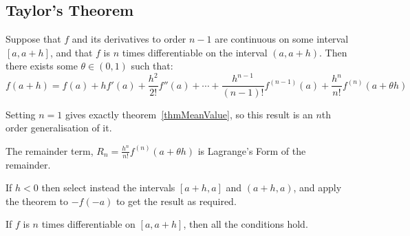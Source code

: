 \documentclass[../Main.tex]{subfiles}
\begin{document}
\subsection{Taylor's Theorem}
\begin{theorem}
    Suppose that $f$ and its derivatives to order $n - 1$ are continuous on some interval $[a, a + h]$, and that $f$ is $n$ times differentiable on the interval $(a, a + h)$. Then there exists some $\theta \in (0, 1)$ such that:
    \begin{equation*}
        f(a + h) = f(a) + hf'(a) + \frac{h^2}{2!} f''(a) + \cdots + \frac{h^{n-1}}{(n-1)!} f^{(n-1)}(a) + \frac{h^n}{n!} f^{(n)}(a + \theta h)
    \end{equation*}
    \label{thmTaylorsI}
\end{theorem}
\begin{remarks}
    \item Setting $n = 1$ gives exactly theorem~\ref{thmMeanValue}, so this result is an $n$th order generalisation of it.
    \item The remainder term, $R_n = \frac{h^n}{n!} f^{(n)}(a + \theta h)$ is Lagrange's Form of the remainder.
    \item If $h < 0$ then select instead the intervals $[a + h, a]$ and $(a + h, a)$, and apply the theorem to $-f(-a)$ to get the result as required.
    \item If $f$ is $n$ times differentiable on $[a, a + h]$, then all the conditions hold.
\end{remarks}
\end{document}
